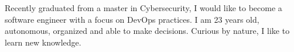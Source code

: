 
\begin{cvparagraph}
    Recently graduated from a master in Cybersecurity, I would like to become a software engineer with a focus on DevOps practices. 
    I am 23 years old, autonomous, organized and able to make decisions. Curious by nature, I like to learn new knowledge.
\end{cvparagraph}
